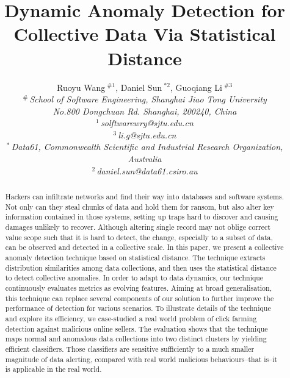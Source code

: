 \documentclass[a4paper]{IEEEtran}
\title{Dynamic Anomaly Detection for Collective Data Via Statistical Distance}
\author{%
	{Ruoyu Wang{\small $~^{\#1}$}, Daniel Sun{\small $~^{*2}$}, Guoqiang Li{\small $~^{\#3}$} }%
	\vspace{1.6mm}\\
	\fontsize{10}{10}\selectfont\itshape
	$^{\#}$\,School of Software Engineering, Shanghai Jiao Tong University\\
	No.800 Dongchuan Rd. Shanghai, 200240, China\\
	\fontsize{9}{9}\selectfont\ttfamily\upshape
	$^{1}$\,solftwarewry@sjtu.edu.cn\\
	$^{3}$\,li.g@sjtu.edu.cn%
	\vspace{1.2mm}\\
	\fontsize{10}{10}\selectfont\rmfamily\itshape
	$^{*}$\,Data61, Commonwealth Scientific and Industrial Research Organization, Australia\\
	\fontsize{9}{9}\selectfont\ttfamily\upshape
	$^{2}$\,daniel.sun@data61.csiro.au
}
\begin{document}
	\maketitle
	
	\begin{abstract}
		Hackers can infiltrate networks and find their way into databases and software systems. Not only
		can they steal chunks of data and hold them for ransom, but
		also alter key information contained in those systems, setting up
		traps hard to discover and causing damages unlikely to recover.
		Although altering single record may not oblige correct value scope such that it is hard to detect, the change, especially to a subset of data, can be observed and detected in a collective
		scale. In this paper, we present a collective anomaly
		detection technique based on statistical distance. The technique
		extracts distribution similarities among data collections, and then uses the statistical distance to detect
		collective anomalies. In order to adapt to data dynamics, our technique continuously evaluates 
		metrics as evolving features. Aiming at broad generalisation, this
		technique can replace several components of our solution to further improve the
		performance of detection for various scenarios. To illustrate details of the technique
		and explore its efficiency, we case-studied a real
		world problem of click farming detection against malicious online
		sellers. The evaluation shows that the technique maps normal
		and anomalous data collections into two distinct clusters by yielding
		efficient classifiers. Those classifiers are sensitive sufficiently to
		a much smaller magnitude of data alerting, compared with real
		world malicious behaviours--that is--it is applicable in the real world. 
		
	\end{abstract}
	
\end{document}
